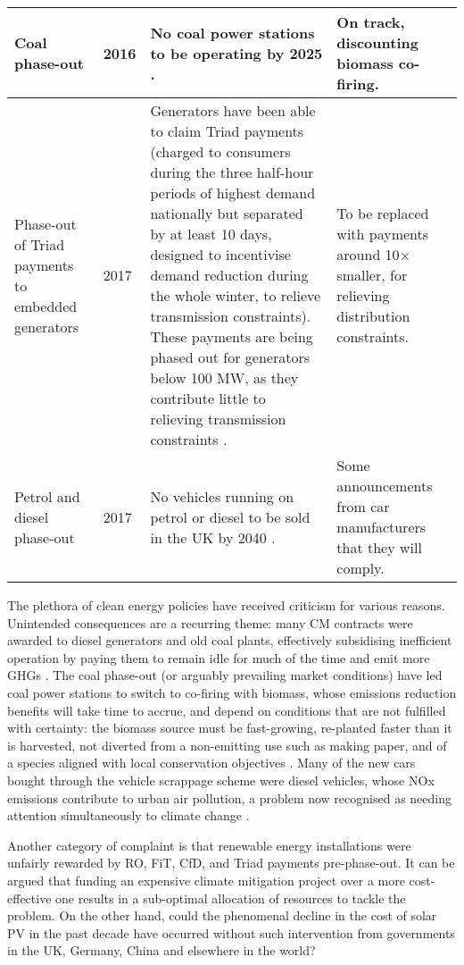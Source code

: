 \documentclass[report_18month.tex]{subfiles}
\begin{document}
\begin{center}
\begin{table}[h!]
\begin{tabular}{ M{2.4cm} M{1.3cm} M{7.6cm} M{3cm} }
\hline
 Coal phase-out & 2016 & No coal power stations to be operating by 2025 \cite{govuk2016coal}. & On track, discounting biomass co-firing. \\
\hline
 Phase-out of Triad payments to embedded generators & 2017 & Generators have been able to claim Triad payments (charged to consumers during the three half-hour periods of highest demand nationally but separated by at least 10 days, designed to incentivise demand reduction during the whole winter, to relieve transmission constraints). These payments are being phased out for generators below 100 MW, as they contribute little to relieving transmission constraints \cite{ofgem2017triads}. & To be replaced with payments around 10$\times$ smaller, for relieving distribution constraints. \\
\hline
 Petrol and diesel phase-out & 2017 & No vehicles running on petrol or diesel to be sold in the UK by 2040 \cite{petroff2017ev}. & Some announcements from car manufacturers that they will comply. \\ 
  \hline
\end{tabular}
\label{table:UKactions}
\end{table}
\end{center}

The plethora of clean energy policies have received criticism for various reasons. Unintended consequences are a recurring theme: many CM contracts were awarded to diesel generators and old coal plants, effectively subsidising inefficient operation by paying them to remain idle for much of the time and emit more GHGs \cite{mattholie2017cm}. The coal phase-out (or arguably prevailing market conditions) have led coal power stations to switch to co-firing with biomass, whose emissions reduction benefits will take time to accrue, and depend on conditions that are not fulfilled with certainty: the biomass source must be fast-growing, re-planted faster than it is harvested, not diverted from a non-emitting use such as making paper, and of a species aligned with local conservation objectives \cite{lamers2013biomass}. Many of the new cars bought through the vehicle scrappage scheme were diesel vehicles, whose NOx emissions contribute to urban air pollution, a problem now recognised as needing attention simultaneously to climate change \cite{petroff2017ev}.

Another category of complaint is that renewable energy installations were unfairly rewarded by RO, FiT, CfD, and Triad payments pre-phase-out. It can be argued that funding an expensive climate mitigation project over a more cost-effective one results in a sub-optimal allocation of resources to tackle the problem. On the other hand, could the phenomenal decline in the cost of solar PV in the past decade have occurred without such intervention from governments in the UK, Germany, China and elsewhere in the world?
\end{document}
